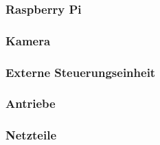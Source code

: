 \subsubsection{Raspberry Pi}


\subsubsection{Kamera}


\subsubsection{Externe Steuerungseinheit}


\subsubsection{Antriebe}


\subsubsection{Netzteile}

